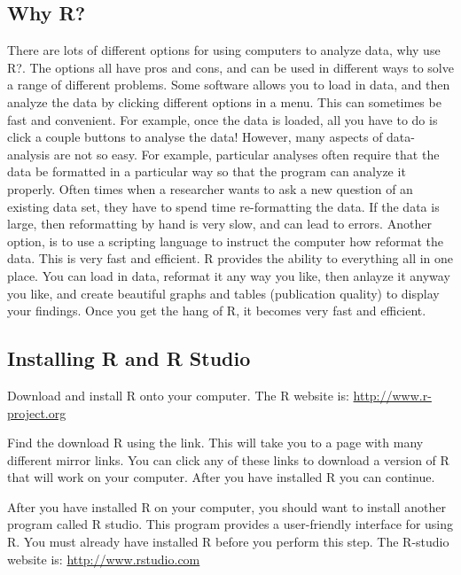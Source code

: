 \documentclass[
]{book}
\begin{document}
\hypertarget{why-r}{%
\subsection{Why R?}\label{why-r}}

There are lots of different options for using computers to analyze data, why use R?. The options all have pros and cons, and can be used in different ways to solve a range of different problems. Some software allows you to load in data, and then analyze the data by clicking different options in a menu. This can sometimes be fast and convenient. For example, once the data is loaded, all you have to do is click a couple buttons to analyse the data! However, many aspects of data-analysis are not so easy. For example, particular analyses often require that the data be formatted in a particular way so that the program can analyze it properly. Often times when a researcher wants to ask a new question of an existing data set, they have to spend time re-formatting the data. If the data is large, then reformatting by hand is very slow, and can lead to errors. Another option, is to use a scripting language to instruct the computer how reformat the data. This is very fast and efficient. R provides the ability to everything all in one place. You can load in data, reformat it any way you like, then anlayze it anyway you like, and create beautiful graphs and tables (publication quality) to display your findings. Once you get the hang of R, it becomes very fast and efficient.

\hypertarget{installing-r-and-r-studio}{%
\subsection{Installing R and R Studio}\label{installing-r-and-r-studio}}

Download and install R onto your computer. The R website is: \url{http://www.r-project.org}

Find the download R using the link. This will take you to a page with many different mirror links. You can click any of these links to download a version of R that will work on your computer. After you have installed R you can continue.

After you have installed R on your computer, you should want to install another program called R studio. This program provides a user-friendly interface for using R. You must already have installed R before you perform this step. The R-studio website is: \url{http://www.rstudio.com}
\end{document}
